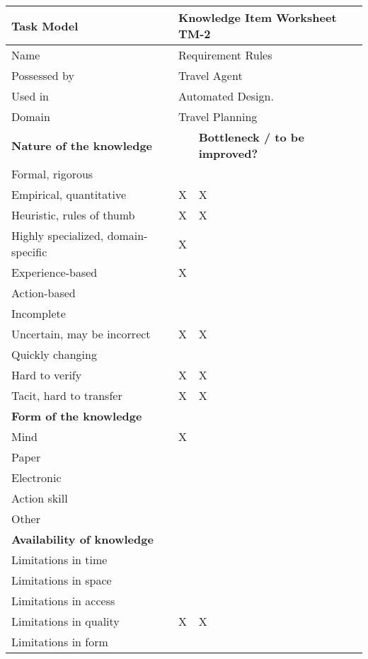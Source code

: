 \begin{tabular}%
       {|p{3cm}%
        |p{2cm}%
        |p{4.2cm}|}
\hline
{\bf Task Model} &
\multicolumn{2}{|l|}{ {\bf Knowledge Item Worksheet TM-2} } \\
\hline
\hline
\sc Name & \multicolumn{2}{|l|}{{\rm Requirement Rules} } \\
\sc Possessed by & \multicolumn{2}{|l|}{{\rm Travel Agent} } \\
\sc Used in & \multicolumn{2}{|l|}{{\rm Automated Design.} } \\
\sc Domain & \multicolumn{2}{|l|}{{\rm Travel Planning}}\\
\hline
\hline
\multicolumn{2}{|l|}{ {\bf Nature of the knowledge} }
 & {\bf Bottleneck / to be improved?} \\
\hline
Formal, rigorous & & \\
\hline
Empirical, quantitative & X & X\\
\hline
Heuristic, rules of thumb & X & X\\
\hline
Highly specialized, domain-specific & X & \\
\hline
Experience-based & X & \\
\hline
Action-based & & \\
\hline
Incomplete  & & \\
\hline
Uncertain, may be incorrect & X & X\\
\hline
Quickly changing & & \\
\hline
Hard to verify & X & X\\
\hline
Tacit, hard to transfer & X & X\\
\hline
\hline
\multicolumn{3}{|l|}{ {\bf Form of the knowledge} } \\
\hline
Mind & X & \\
\hline
Paper & & \\
\hline
Electronic & & \\
\hline
Action skill & & \\
\hline
Other & & \\
\hline
\hline
\multicolumn{3}{|l|}{ {\bf Availability of knowledge} } \\
\hline
Limitations in time  & & \\
\hline
Limitations in space & & \\
\hline
Limitations in access & & \\
\hline
Limitations in quality & X & X\\
\hline
Limitations in form & & \\
\hline
\end{tabular}

